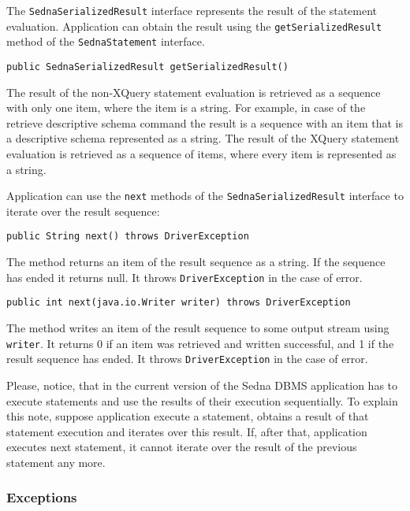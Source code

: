 \documentclass[a4paper,12pt]{article}
\begin{document}
The \verb!SednaSerializedResult! interface represents the result of the statement evaluation. Application can obtain the result using the \verb!getSerializedResult! method of the \verb!SednaStatement! interface.

\begin{verbatim}
public SednaSerializedResult getSerializedResult()
\end{verbatim}

The result of the non-XQuery statement evaluation is retrieved as a sequence with only one item, where the item is a string. For example, in case of the retrieve descriptive schema command the result is a sequence with an item that is a descriptive schema represented as a string. The result of the XQuery statement evaluation is retrieved as a sequence of items, where every item is represented as a string.

Application can use the \verb!next! methods of the \verb!SednaSerializedResult! interface to iterate over the result sequence:

\begin{verbatim}
public String next() throws DriverException
\end{verbatim}

The method returns an item of the result sequence as a string. If the sequence has ended it returns null. It throws \verb!DriverException! in the case of error.

\begin{verbatim}
public int next(java.io.Writer writer) throws DriverException
\end{verbatim}

The method writes an item of the result sequence to some output stream using \verb!writer!. It returns 0 if an item was retrieved and written successful, and 1 if the result sequence has ended. It throws \verb!DriverException! in the case of error.

Please, notice, that in the current version of the Sedna DBMS application has to execute statements and use the results of their execution sequentially. To explain this note, suppose application execute a statement, obtains a result of that statement execution and iterates over this result. If, after that, application executes next statement, it cannot iterate over the result of the previous statement any more.

\subsubsection{Exceptions}
\end{document}
